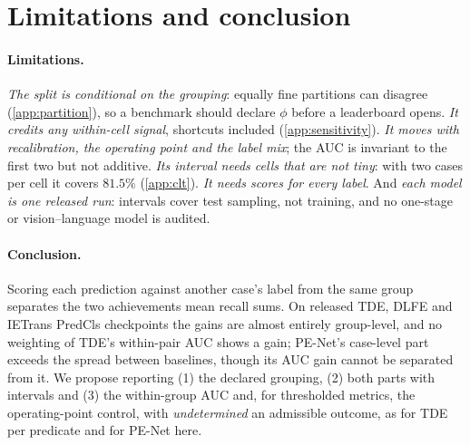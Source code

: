 \section{Limitations and conclusion}\label{sec:discussion}

\paragraph{Limitations.} \emph{The split is conditional on the grouping}: equally fine
partitions can disagree (\cref{app:partition}), so a benchmark should declare $\phi$ before a
leaderboard opens. \emph{It credits any within-cell signal}, shortcuts included
(\cref{app:sensitivity}). \emph{It moves with recalibration, the operating point and the label
mix}; the AUC is invariant to the first two but not additive. \emph{Its interval needs cells
that are not tiny}: with two cases per cell it covers $81.5\%$ (\cref{app:clt}). \emph{It needs
scores for every label}. And \emph{each model is one released run}: intervals cover test
sampling, not training, and no one-stage or vision--language model is audited.

\paragraph{Conclusion.} Scoring each prediction against another case's label from the same group
separates the two achievements mean recall sums. On released TDE, DLFE and IETrans PredCls
checkpoints the gains are almost entirely group-level, and no weighting of TDE's within-pair AUC
shows a gain; PE-Net's case-level part exceeds the spread between baselines, though its AUC gain
cannot be separated from it. We propose reporting (1) the declared grouping, (2) both parts with intervals and
(3) the within-group AUC and, for thresholded metrics, the operating-point control, with
\emph{undetermined} an admissible outcome, as for TDE per predicate and for PE-Net here.

